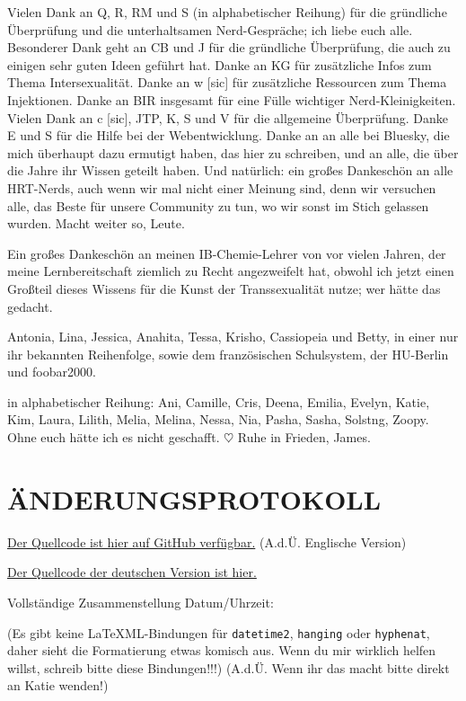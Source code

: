 \documentclass{article}
\begin{document}
Vielen Dank an Q, R, RM und S (in alphabetischer Reihung) für die gründliche Überprüfung und die unterhaltsamen Nerd-Gespräche; ich liebe euch alle. Besonderer Dank geht an CB und J für die gründliche Überprüfung, die auch zu einigen sehr guten Ideen geführt hat. Danke an KG für zusätzliche Infos zum Thema Intersexualität. Danke an w [sic] für zusätzliche Ressourcen zum Thema Injektionen. Danke an BIR insgesamt für eine Fülle wichtiger Nerd-Kleinigkeiten. Vielen Dank an c [sic], JTP, K, S und V für die allgemeine Überprüfung. Danke E und S für die Hilfe bei der Webentwicklung. Danke an an alle bei Bluesky, die mich überhaupt dazu ermutigt haben, das hier zu schreiben, und an alle, die über die Jahre ihr Wissen geteilt haben. Und natürlich: ein großes Dankeschön an alle HRT-Nerds, auch wenn wir mal nicht einer Meinung sind, denn wir versuchen alle, das Beste für unsere Community zu tun, wo wir sonst im Stich gelassen wurden. Macht weiter so, Leute.

Ein großes Dankeschön an meinen IB-Chemie-Lehrer von vor vielen Jahren, der meine Lernbereitschaft ziemlich zu Recht angezweifelt hat, obwohl ich jetzt einen Großteil dieses Wissens für die Kunst der Transsexualität nutze; wer hätte das gedacht.

 Antonia, Lina, Jessica, Anahita, Tessa, Krisho, Cassiopeia und Betty, in einer nur ihr bekannten Reihenfolge, sowie dem französischen Schulsystem, der HU-Berlin und foobar2000.

in alphabetischer Reihung: Ani, Camille, Cris, Deena, Emilia, Evelyn, Katie, Kim, Laura, Lilith, Melia, Melina, Nessa, Nia, Pasha, Sasha, Solstng, Zoopy. Ohne euch hätte ich es nicht geschafft. $\heartsuit$  Ruhe in Frieden, James.

\section*{ÄNDERUNGSPROTOKOLL}

\noindent \href{https://github.com/Juicysteak117/pghrt/}{Der Quellcode ist hier auf GitHub verfügbar.} (A.d.Ü. Englische Version)

\noindent \href{https://github.com/synthie-cat/pghrt-de}{Der Quellcode der deutschen Version ist hier.}

\noindent Vollständige Zusammenstellung Datum/Uhrzeit: \DTMnow

\noindent(Es gibt keine LaTeXML-Bindungen für \texttt{datetime2}, \texttt{hanging} oder \texttt{hyphenat}, daher sieht die Formatierung etwas komisch aus. Wenn du mir wirklich helfen willst, schreib bitte diese Bindungen!!!) (A.d.Ü. Wenn ihr das macht bitte direkt an Katie wenden!)
\end{document}
